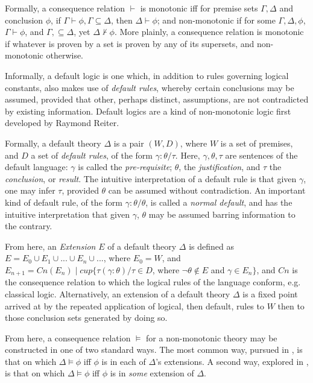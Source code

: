 \documentclass[]{article}
\begin{document}
Formally, a consequence relation $\vdash$ is monotonic iff for premise sets $\Gamma, \Delta$ and conclusion $\phi$, if $\Gamma \vdash \phi, \Gamma \subseteq \Delta$, then $\Delta \vdash \phi$; and non-monotonic if for some $\Gamma, \Delta, \phi$, $\Gamma \vdash \phi$, and $\Gamma, \subseteq \Delta$, yet $\Delta \nvdash \phi$. More plainly, a consequence relation is monotonic if whatever is proven by a set is proven by any of its supersets, and non-monotonic otherwise.

Informally, a default logic is one which, in addition to rules governing logical constants, also makes use of \textit{default rules}, whereby certain conclusions may be assumed, provided that other, perhaps distinct, assumptions, are not contradicted by existing information. Default logics are a kind of non-monotonic logic first developed by Raymond Reiter.

Formally, a default theory $\Delta$ is a pair $(W, D)$, where $W$ is a set of premises, and $D$ a set of \textit{default rules}, of the form $\gamma : \theta / \tau$. Here, $\gamma, \theta, \tau$ are sentences of the default language: $\gamma$ is called the \textit{pre-requisite}; $\theta$, the \textit{justification}, and $\tau$ the \textit{conclusion}, or \textit{result}. The intuitive interpretation of a default rule is that given $\gamma$, one may infer $\tau$, provided $\theta$ can be assumed without contradiction. An important kind of default rule, of the form $\gamma : \theta / \theta$, is called a \textit{normal default}, and has the intuitive interpretation that given $\gamma$, $\theta$ may be assumed barring information to the contrary.

From here, an \textit{Extension} $E$ of a default theory $\Delta$ is defined as $E = E_{0} \cup E_{1} \cup ... \cup E_{n} \cup ...$, where $E_{0} = W$, and $E_{n+1} = Cn(E_{n}) \mid cup \{\tau (\gamma : \theta) / \tau \in D$, where $\neg\theta \notin E$ and $\gamma \in E_{n}\}$, and $Cn$ is the consequence relation to which the logical rules of the language conform, e.g. classical logic. Alternatively, an extension of a default theory $\Delta$ is a fixed point arrived at by the repeated application of logical, then default, rules to $W$ then to those conclusion sets generated by doing so. 

From here, a consequence relation $\vDash$ for a non-monotonic theory may be constructed in one of two standard ways. The most common way, pursued in \cite{Reiter1980}, is that on which $\Delta \vDash \phi$ iff $\phi$ is in each of $\Delta$'s extensions. A second way, explored in \cite{Horty1994}, is that on which $\Delta \vDash \phi$ iff $\phi$ is in \textit{some} extension of $\Delta$.
\end{document}
